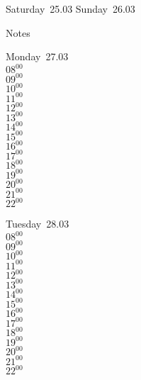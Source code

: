 \documentclass[11pt,a4paper]{book}\usepackage[]{graphicx}\usepackage[]{color}
\begin{document}
\begin{weekendbox}
  Saturday~25.03
  \tcblower
  Sunday~26.03
\end{weekendbox} %
\begin{notebox}
  Notes
\end{notebox}
\clearpage
\begin{headerbox}
\end{headerbox}
\begin{weekdaybox}
  Monday~27.03\\
  { 
  \vfill
  $08^{00}$\\
$09^{00}$\\
$10^{00}$\\
$11^{00}$\\
$12^{00}$\\
$13^{00}$\\
$14^{00}$\\
$15^{00}$\\
$16^{00}$\\
$17^{00}$\\
$18^{00}$\\
$19^{00}$\\
$20^{00}$\\
$21^{00}$\\
$22^{00}$\\
  }
\end{weekdaybox}
\begin{weekdaybox}
  Tuesday~28.03\\
  { 
  \vfill
  $08^{00}$\\
$09^{00}$\\
$10^{00}$\\
$11^{00}$\\
$12^{00}$\\
$13^{00}$\\
$14^{00}$\\
$15^{00}$\\
$16^{00}$\\
$17^{00}$\\
$18^{00}$\\
$19^{00}$\\
$20^{00}$\\
$21^{00}$\\
$22^{00}$\\
  }
\end{weekdaybox}
\end{document}

